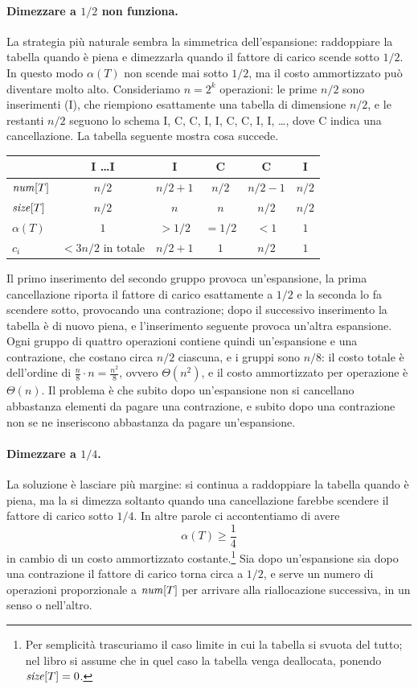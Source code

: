 \paragraph{Dimezzare a $1/2$ non funziona.}
La strategia più naturale sembra la simmetrica dell'espansione: raddoppiare la tabella quando è piena e dimezzarla quando il fattore di carico scende sotto $1/2$. In questo modo $\alpha(T)$ non scende mai sotto $1/2$, ma il costo ammortizzato può diventare molto alto. Consideriamo $n = 2^k$ operazioni: le prime $n/2$ sono inserimenti (I), che riempiono esattamente una tabella di dimensione $n/2$, e le restanti $n/2$ seguono lo schema I, C, C, I, I, C, C, I, I, \dots, dove C indica una cancellazione. La tabella seguente mostra cosa succede.

\begin{center}
\small
\begin{tabular}{lccccc}
\toprule
 & \multicolumn{1}{c}{I \dots I} & I & C & C & I \\
\midrule
$\mathit{num}[T]$ & $n/2$ & $n/2 + 1$ & $n/2$ & $n/2 - 1$ & $n/2$ \\
$\mathit{size}[T]$ & $n/2$ & $n$ & $n$ & $n/2$ & $n/2$ \\
$\alpha(T)$ & $1$ & $> 1/2$ & $= 1/2$ & $< 1$ & $1$ \\
$c_i$ & $< 3n/2$ in totale & $n/2 + 1$ & $1$ & $n/2$ & $1$ \\
\bottomrule
\end{tabular}
\end{center}

\noindent
Il primo inserimento del secondo gruppo provoca un'espansione, la prima cancellazione riporta il fattore di carico esattamente a $1/2$ e la seconda lo fa scendere sotto, provocando una contrazione; dopo il successivo inserimento la tabella è di nuovo piena, e l'inserimento seguente provoca un'altra espansione. Ogni gruppo di quattro operazioni contiene quindi un'espansione e una contrazione, che costano circa $n/2$ ciascuna, e i gruppi sono $n/8$: il costo totale è dell'ordine di $\frac{n}{8}\cdot n = \frac{n^2}{8}$, ovvero $\Theta(n^2)$, e il costo ammortizzato per operazione è $\Theta(n)$. Il problema è che subito dopo un'espansione non si cancellano abbastanza elementi da pagare una contrazione, e subito dopo una contrazione non se ne inseriscono abbastanza da pagare un'espansione.

\paragraph{Dimezzare a $1/4$.}
La soluzione è lasciare più margine: si continua a raddoppiare la tabella quando è piena, ma la si dimezza soltanto quando una cancellazione farebbe scendere il fattore di carico sotto $1/4$. In altre parole ci accontentiamo di avere
\[
\alpha(T) \ge \frac{1}{4}
\]
in cambio di un costo ammortizzato costante.\footnote{Per semplicità trascuriamo il caso limite in cui la tabella si svuota del tutto; nel libro si assume che in quel caso la tabella venga deallocata, ponendo $\mathit{size}[T] = 0$.} Sia dopo un'espansione sia dopo una contrazione il fattore di carico torna circa a $1/2$, e serve un numero di operazioni proporzionale a $\mathit{num}[T]$ per arrivare alla riallocazione successiva, in un senso o nell'altro.

